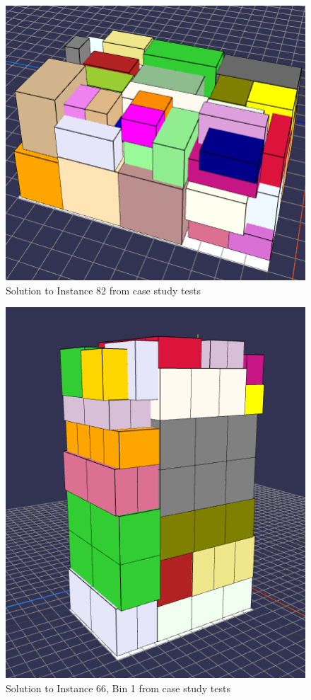 \documentclass[11pt,a4paper,twocolumn]{article}
\begin{document}
\begin{figure}
    \centering
    \includegraphics[width = \columnwidth]{tests/usecase/instance-82_k200.PNG}
    \caption{Solution to Instance 82 from case study tests}
    \label{fig:usecase_82}
\end{figure}

\begin{figure}
    \centering
    \includegraphics[width = \columnwidth]{tests/usecase/instance-66_bin1_k200.PNG}
    \caption{Solution to Instance 66, Bin 1 from case study tests}
    \label{fig:usecase_86}
\end{figure}
\end{document}
